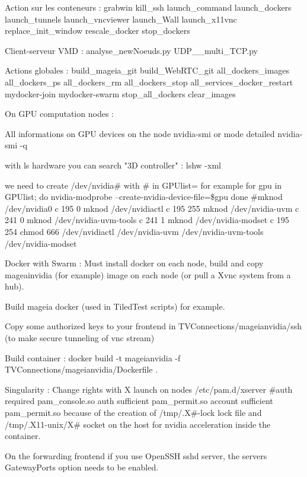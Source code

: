 Action sur les conteneurs :\+ grabwin kill\+\_\+ssh launch\+\_\+command launch\+\_\+dockers launch\+\_\+tunnels launch\+\_\+vncviewer launch\+\_\+\+Wall launch\+\_\+x11vnc replace\+\_\+init\+\_\+window rescale\+\_\+docker stop\+\_\+dockers

Client-\/serveur VMD :\+ analyse\+\_\+new\+Noeuds.\+py UDP\+\_\+\_\+multi\+\_\+\+TCP.\+py

Actions globales :\+ build\+\_\+mageia\+\_\+git build\+\_\+\+Web\+RTC\+\_\+git all\+\_\+dockers\+\_\+images all\+\_\+dockers\+\_\+ps all\+\_\+dockers\+\_\+rm all\+\_\+dockers\+\_\+stop all\+\_\+services\+\_\+docker\+\_\+restart mydocker-\/join mydocker-\/swarm stop\+\_\+all\+\_\+dockers clear\+\_\+images

On GPU computation nodes :\+
\begin{DoxyItemize}
\item All informations on GPU devices on the node nvidia-\/smi or mode detailed nvidia-\/smi -\/q
\item with ls hardware you can search "{}3\+D controller"{} :\+ lshw -\/xml
\item we need to create /\+dev/\+nvidia\# with \# in GPUlist=\+[0-\/4]\+ for example for gpu in GPUlist; do nvidia-\/modprobe --create-\/nvidia-\/device-\/file=\$gpu done \+\#mknod /\+dev/\+nvidia0 c 195 0 mknod /\+dev/\+nvidiactl c 195 255 mknod /\+dev/\+nvidia-\/uvm c 241 0 mknod /\+dev/\+nvidia-\/uvm-\/tools c 241 1 mknod /\+dev/\+nvidia-\/modset c 195 254 chmod 666 /\+dev/\+nvidiactl /\+dev/\+nvidia-\/uvm /\+dev/\+nvidia-\/uvm-\/tools /\+dev/\+nvidia-\/modset
\end{DoxyItemize}

Docker with Swarm :\+ Must install docker on each node, build and copy mageainvidia (for example) image on each node (or pull a Xvnc system from a hub).

Build mageia docker (used in Tiled\+Test scripts) for example.
\begin{DoxyItemize}
\item Copy some authorized keys to your frontend in TVConnections/\+mageianvidia/\+ssh (to make secure tunneling of vnc stream)
\item Build container :\+ docker build -\/t mageianvidia -\/f TVConnections/\+mageianvidia/\+\+Dockerfile .
\end{DoxyItemize}

Singularity :\+ Change rights with X launch on nodes /\+etc/\+pam.d/\+xserver \+\#auth required pam\+\_\+console.\+so auth sufficient pam\+\_\+permit.\+so account sufficient pam\+\_\+permit.\+so because of the creation of /\+tmp/\+.X\#-\/lock lock file and /\+tmp/\+.X11-\/unix/\+X\# socket on the host for nvidia acceleration inside the container.

On the forwarding frontend if you use Open\+SSH sshd server, the server\textquotesingle{}s Gateway\+Ports option needs to be enabled. 
